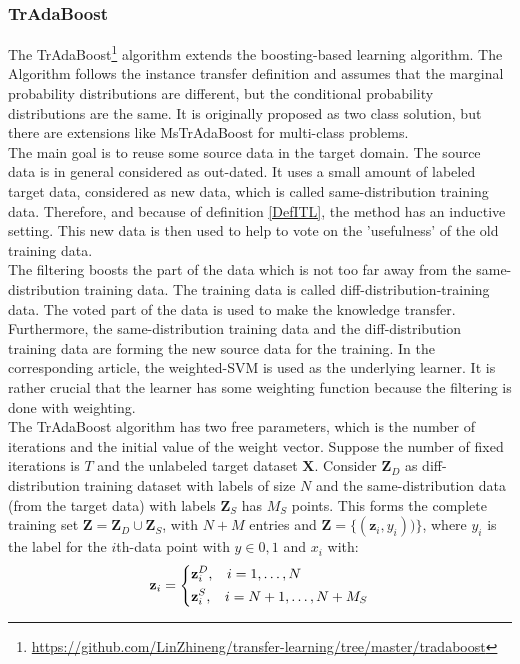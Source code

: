 \subsubsection{TrAdaBoost}
The TrAdaBoost\footnote{\url{https://github.com/LinZhineng/transfer-learning/tree/master/tradaboost}} algorithm extends the boosting-based learning algorithm.
The Algorithm follows the instance transfer definition and assumes that the marginal probability distributions are different, but the conditional probability distributions are the same.\cite{Dai.}
It is originally proposed as two class solution, but there are extensions like MsTrAdaBoost for multi-class problems.\cite{Huang.2012}\\
The main goal is to reuse some source data in the target domain.
The source data is in general considered as out-dated.
It uses a small amount of labeled target data, considered as new data, which is called same-distribution training data.
Therefore, and because of definition \ref{DefITL}, the method has an inductive setting.
This new data is then used to help to vote on the 'usefulness' of the old training data.\cite{Dai.}\\
The filtering boosts the part of the data which is not too far away from the same-distribution training data.
The training data is called diff-distribution-training data.
The voted part of the data is used to make the knowledge transfer.
Furthermore, the same-distribution training data and the diff-distribution training data are forming the new source data for the training.
In the corresponding article, the weighted-\acs{SVM} is used as the underlying learner.
It is rather crucial that the learner has some weighting function because the filtering is done with weighting.\cite{Dai.}\\
The TrAdaBoost algorithm has two free parameters, which is the number of iterations and the initial value of the weight vector.
Suppose the number of fixed iterations is $T$ and the unlabeled target dataset $\mathbf{X}$.
Consider $\mathbf{Z}_D$ as diff-distribution training dataset with labels of size $N$ and the same-distribution data (from the target data) with labels $\mathbf{Z}_S$ has $M_S$ points.
This forms the complete training set $\mathbf{Z}=\mathbf{Z}_D\cup \mathbf{Z}_S$, with $N+M$ entries and $\mathbf{\mathbf{Z}}=\{(\mathbf{z}_i,y_i))\}$, where $y_i$ is the label for the $i$th-data point with $y\in {0,1}$ and $x_i$ with:\cite{Dai.}
\begin{equation*}
	\mathbf{z}_i = \begin{dcases}
						\mathbf{z}_i^D, \>\>\>\> i = 1,\dots,N\\
						\mathbf{z}_i^S, \>\>\>\> i = N +1,\dots,N+M_S
			  	   \end{dcases}
\end{equation*}
